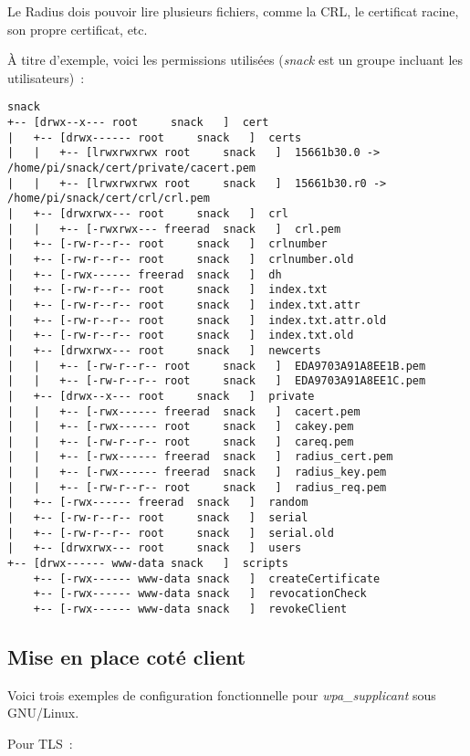 Le Radius dois pouvoir lire plusieurs fichiers, comme la CRL, le certificat racine, son propre certificat, etc.

À titre d'exemple, voici les permissions utilisées (\emph{snack} est un groupe incluant les utilisateurs)~:

\begin{lstlisting}
snack
+-- [drwx--x--- root     snack   ]  cert
|   +-- [drwx------ root     snack   ]  certs
|   |   +-- [lrwxrwxrwx root     snack   ]  15661b30.0 -> /home/pi/snack/cert/private/cacert.pem
|   |   +-- [lrwxrwxrwx root     snack   ]  15661b30.r0 -> /home/pi/snack/cert/crl/crl.pem
|   +-- [drwxrwx--- root     snack   ]  crl
|   |   +-- [-rwxrwx--- freerad  snack   ]  crl.pem
|   +-- [-rw-r--r-- root     snack   ]  crlnumber
|   +-- [-rw-r--r-- root     snack   ]  crlnumber.old
|   +-- [-rwx------ freerad  snack   ]  dh
|   +-- [-rw-r--r-- root     snack   ]  index.txt
|   +-- [-rw-r--r-- root     snack   ]  index.txt.attr
|   +-- [-rw-r--r-- root     snack   ]  index.txt.attr.old
|   +-- [-rw-r--r-- root     snack   ]  index.txt.old
|   +-- [drwxrwx--- root     snack   ]  newcerts
|   |   +-- [-rw-r--r-- root     snack   ]  EDA9703A91A8EE1B.pem
|   |   +-- [-rw-r--r-- root     snack   ]  EDA9703A91A8EE1C.pem
|   +-- [drwx--x--- root     snack   ]  private
|   |   +-- [-rwx------ freerad  snack   ]  cacert.pem
|   |   +-- [-rwx------ root     snack   ]  cakey.pem
|   |   +-- [-rw-r--r-- root     snack   ]  careq.pem
|   |   +-- [-rwx------ freerad  snack   ]  radius_cert.pem
|   |   +-- [-rwx------ freerad  snack   ]  radius_key.pem
|   |   +-- [-rw-r--r-- root     snack   ]  radius_req.pem
|   +-- [-rwx------ freerad  snack   ]  random
|   +-- [-rw-r--r-- root     snack   ]  serial
|   +-- [-rw-r--r-- root     snack   ]  serial.old
|   +-- [drwxrwx--- root     snack   ]  users
+-- [drwx------ www-data snack   ]  scripts
    +-- [-rwx------ www-data snack   ]  createCertificate
    +-- [-rwx------ www-data snack   ]  revocationCheck
    +-- [-rwx------ www-data snack   ]  revokeClient
\end{lstlisting}

\subsection{Mise en place coté client}

Voici trois exemples de configuration fonctionnelle pour \emph{wpa\_supplicant} sous GNU/Linux. 

Pour TLS~:

